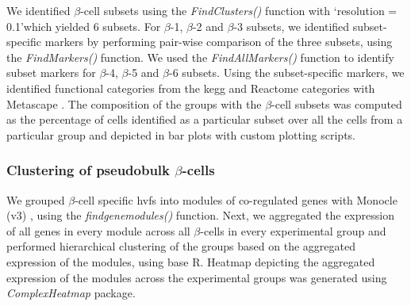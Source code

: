 \par We identified $\beta$-cell subsets using the \textit{FindClusters()} function with `resolution = 0.1'which yielded 6 subsets. For $\beta$-1, $\beta$-2 and $\beta$-3 subsets, we identified subset-specific markers by performing pair-wise comparison of the three subsets, using the \textit{FindMarkers()} function. We used the \textit{FindAllMarkers()} function to identify subset markers for $\beta$-4, $\beta$-5 and $\beta$-6 subsets. Using the subset-specific markers, we identified functional categories from the \gls{kegg} and Reactome categories with Metascape \textbf{\cite{zhou_metascape_2019}}. The composition of the groups with the $\beta$-cell subsets was computed as the percentage of cells identified as a particular subset over all the cells from a particular group and depicted in bar plots with custom plotting scripts.

\subsubsection{\large Clustering of pseudobulk $\beta$-cells}
\label{subsubsec:met_chp3_pseudo}
\par We grouped $\beta$-cell specific \glspl{hvf} into modules of co-regulated genes with Monocle (v3) \textbf{\cite{cao_single-cell_2019}}, using the \textit{find\textunderscore gene\textunderscore modules()} function. Next, we aggregated the expression of all genes in every module across all $\beta$-cells in every experimental group and performed hierarchical clustering of the groups based on the aggregated expression of the modules, using base R. Heatmap depicting the aggregated expression of the modules across the experimental groups was generated using \textit{ComplexHeatmap} package.\\

